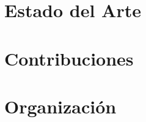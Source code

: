 

\section{Estado del Arte}
\label{sec:intro.estado-del-arte}

\section{Contribuciones}
\label{sec:intro.contribuciones}



\section{Organizaci\'on}
\label{sec:intro.organizacion}


